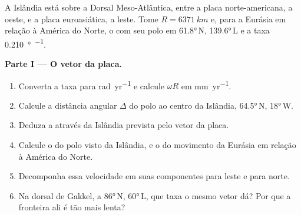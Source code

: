 \begin{problem}
\label{pb:b1:plate-kinematics:1}
A Islândia está sobre a Dorsal Meso-Atlântica, entre a placa norte-americana, a oeste,
e a placa euroasiática, a leste. Tome $R = \qty{6371}{km}$ e, para a Eurásia em
relação à América do Norte, o  com seu polo em
\ang{61.8}\,N, \ang{139.6}\,L e a taxa \qty{0.210}{\degree\per\Myr}.

\medskip
\noindent\textbf{Parte I --- O vetor da placa.}
\begin{enumerate}
  \item Converta a taxa para \unit{rad.yr^{-1}} e calcule $\omega R$ em
        \unit{mm.yr^{-1}}.
  \item Calcule a distância angular $\Delta$ do polo ao centro da
        Islândia, \ang{64.5}\,N, \ang{18}\,W.
  \item Deduza a  através da Islândia prevista pelo
        vetor da placa.
  \item Calcule o  do polo visto da Islândia, e o  do
        movimento da Eurásia em relação à América do Norte.
  \item Decomponha essa velocidade em suas componentes para leste e para norte.
  \item Na dorsal de Gakkel, a \ang{86}\,N, \ang{60}\,L, que taxa o mesmo
        vetor dá? Por que a fronteira ali é tão mais lenta?
\end{enumerate}


\end{problem}
